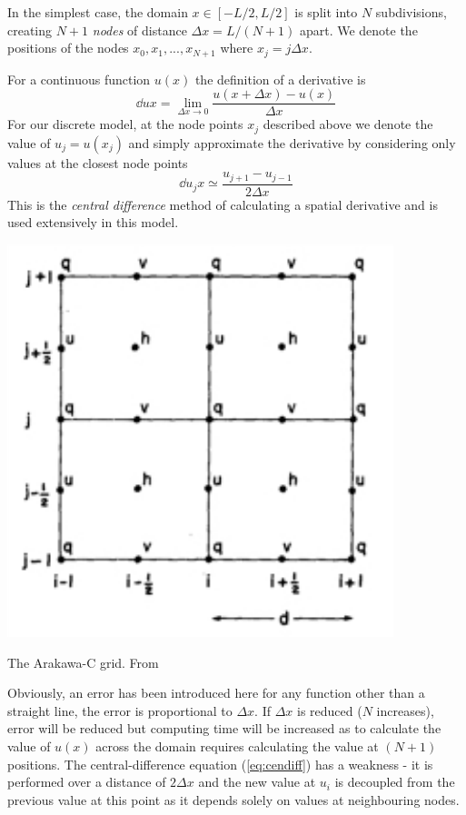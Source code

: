 \documentclass[a4paper, sfsidenotes, twoside]{tufte-handout}
\begin{document}
  In the simplest case, the domain $x \in [-L/2, L/2]$ is split into $N$
  subdivisions, creating $N+1$ \emph{nodes} of distance $\Delta x = L/(N+1)$ apart.
  We denote the positions of the nodes $x_0, x_1, ..., x_{N+1}$ where $x_j = j \Delta x$.

  For a continuous function $u(x)$ the definition of a derivative is
  \begin{equation}
    \dd{u}{x} = \lim_{\Delta x \to 0} \frac{u(x + \Delta x) - u(x)}{\Delta x}
  \end{equation}
  For our discrete model, at the node points $x_j$ described above we denote
  the value of $u_j = u(x_j)$ and simply approximate the derivative by considering
  only values at the closest node points
  \begin{equation}
    \label{eq:cendiff}
    \dd{u_j}{x} \simeq \frac{u_{j+1} - u_{j-1}}{2 \Delta x}
  \end{equation}
  This is the \emph{central difference} method of calculating a spatial derivative
  and is used extensively in this model.
  \begin{marginfigure}
    \includegraphics{cgrid}
    \caption{The Arakawa-C grid. From \citep{Arakawa:1981bx}}
    \label{fig:cgrid}
  \end{marginfigure}
  Obviously, an error has been introduced here for any function other than a
  straight line, the error is proportional to $\Delta x$.
  If $\Delta x$ is reduced ($N$ increases), error will be reduced but computing time will be
  increased as to calculate the value of $u(x)$ across the domain requires
  calculating the value at $(N+1)$ positions.
  The central-difference equation (\ref{eq:cendiff}) has a weakness - it is
  performed over a distance of $2 \Delta x$ and the new value at $u_i$ is
  decoupled from the previous value at this point as it depends solely on
  values at neighbouring nodes.
\end{document}
